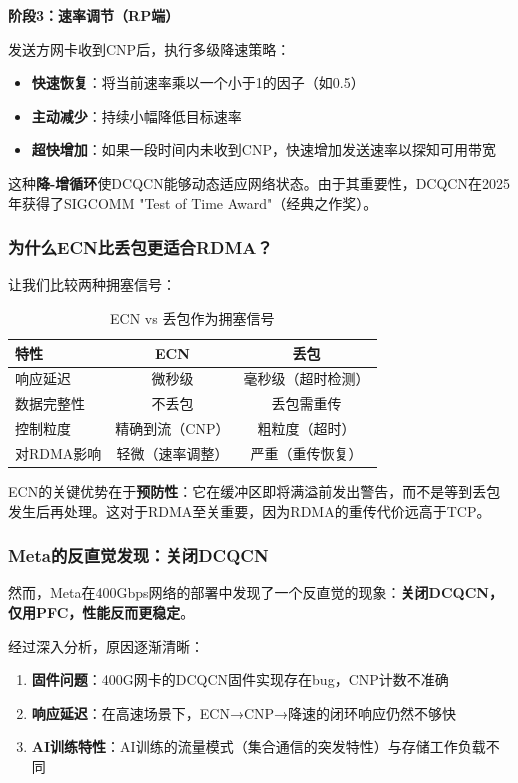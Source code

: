 \textbf{阶段3：速率调节（RP端）}

发送方网卡收到CNP后，执行多级降速策略：

\begin{itemize}
    \item \textbf{快速恢复}：将当前速率乘以一个小于1的因子（如0.5）
    \item \textbf{主动减少}：持续小幅降低目标速率
    \item \textbf{超快增加}：如果一段时间内未收到CNP，快速增加发送速率以探知可用带宽
\end{itemize}

这种\textbf{降-增循环}使DCQCN能够动态适应网络状态。由于其重要性，DCQCN在2025年获得了SIGCOMM "Test of Time Award"（经典之作奖）。

\subsubsection{为什么ECN比丢包更适合RDMA？}

让我们比较两种拥塞信号：

\begin{table}[htbp]
\centering
\caption{ECN vs 丢包作为拥塞信号}
\label{tab:ecn_vs_loss}
\begin{tabular}{|l|c|c|}
\hline
\textbf{特性} & \textbf{ECN} & \textbf{丢包} \\
\hline
响应延迟 & 微秒级 & 毫秒级（超时检测） \\
\hline
数据完整性 & 不丢包 & 丢包需重传 \\
\hline
控制粒度 & 精确到流（CNP） & 粗粒度（超时） \\
\hline
对RDMA影响 & 轻微（速率调整） & 严重（重传恢复） \\
\hline
\end{tabular}
\end{table}

ECN的关键优势在于\textbf{预防性}：它在缓冲区即将满溢前发出警告，而不是等到丢包发生后再处理。这对于RDMA至关重要，因为RDMA的重传代价远高于TCP。

\subsubsection{Meta的反直觉发现：关闭DCQCN}

然而，Meta在400Gbps网络的部署中发现了一个反直觉的现象：\textbf{关闭DCQCN，仅用PFC，性能反而更稳定}。

经过深入分析，原因逐渐清晰：

\begin{enumerate}
    \item \textbf{固件问题}：400G网卡的DCQCN固件实现存在bug，CNP计数不准确
    \item \textbf{响应延迟}：在高速场景下，ECN→CNP→降速的闭环响应仍然不够快
    \item \textbf{AI训练特性}：AI训练的流量模式（集合通信的突发特性）与存储工作负载不同
\end{enumerate}

